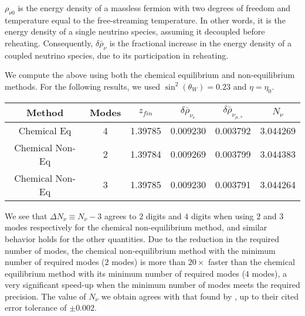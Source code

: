  $\rho_{\nu0}$ is the energy density of a massless fermion with two degrees of freedom and temperature equal to the free-streaming temperature.  In other words, it is the energy density of a single neutrino species, assuming it decoupled before reheating. Consequently, $\delta\bar\rho_\nu$ is the fractional increase in the energy density of a coupled neutrino species, due to its participation in reheating.

We compute the above using both the chemical equilibrium and non-equilibrium methods. For the following results, we used $\sin^2(\theta_W)=0.23$ and $\eta=\eta_0$. 
\begin{table}[ht]\label{table:method_comp}
\centering 
\begin{tabular}{|c|c|c|c|c|c|}
\hline
Method &Modes&$z_{fin}$ & $\delta\bar\rho_{\nu_e}$&   $\delta\bar\rho_{\nu_{\mu,\tau}}$ & $N_{\nu}$  \\
\hline
Chemical Eq& 4 &1.39785 &0.009230 &0.003792 &3.044269\\
\hline
Chemical Non-Eq& 2&1.39784 &0.009269 & 0.003799&3.044383 \\
\hline
Chemical Non-Eq& 3&1.39785&0.009230 & 0.003791&3.044264 \\
\hline
\end{tabular}
\end{table}
We see that $\Delta N_\nu\equiv N_\nu-3$ agrees to $2$ digits and $4$ digits when using $2$ and $3$ modes respectively for the chemical non-equilibrium method, and similar behavior holds for the other quantities. Due to the reduction in the required number of modes, the chemical non-equilibrium method with the minimum number of required modes ($2$ modes) is more than $20\times$ faster than the chemical equilibrium method with its minimum number of required modes ($4$ modes), a very significant speed-up when the minimum number of modes meets the required precision.  The value of $N_\nu$ we obtain agrees with that found by \cite{Mangano:2005cc}, up to their cited error tolerance of $\pm 0.002$.

